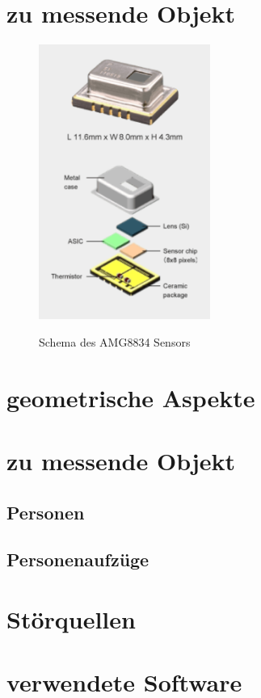 \section{zu messende Objekt}

\begin{figure}[H]
	\centering
	\includegraphics[width=0.5\textwidth]
	{fig/grid_eye_aufbau.PNG}
	\caption[Schema des AMG8834 Sensors]{Schema des AMG8834 Sensors} \protect\cite{AMG8834}
	\label{fig:sens}
\end{figure}

\section{geometrische Aspekte}

\section{zu messende Objekt}


\subsection{Personen}



\subsection{Personenaufzüge}





\section{Störquellen}


\section{verwendete Software}